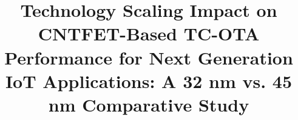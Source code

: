 \title{Technology Scaling Impact on CNTFET-Based TC-OTA Performance for Next Generation IoT Applications: A 32 nm vs. 45 nm Comparative Study}